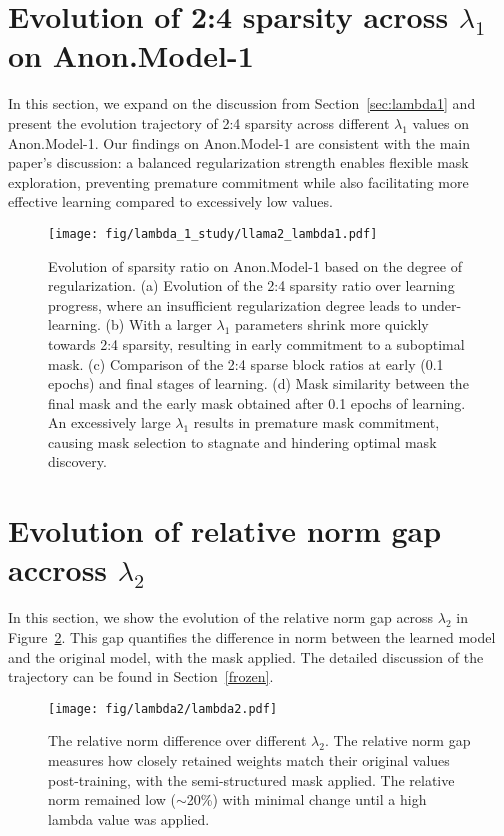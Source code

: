 \section{Evolution of 2:4 sparsity across $\lambda_{1}$ on Anon.Model-1}
In this section, we expand on the discussion from Section~\ref{sec:lambda1} and present the evolution trajectory of 2:4 sparsity across different $\lambda_{1}$ values on Anon.Model-1. Our findings on Anon.Model-1 are consistent with the main paper's discussion: a balanced regularization strength enables flexible mask exploration, preventing premature commitment while also facilitating more effective learning compared to excessively low values.
\label{app:reg_anon}
\begin{figure*}[!t]
    \centering
    \texttt{[image: fig/lambda\_1\_study/llama2\_lambda1.pdf]} 
\caption{Evolution of sparsity ratio on Anon.Model-1 based on the degree of regularization. (a) Evolution of the 2:4 sparsity ratio over learning progress, where an insufficient regularization degree leads to under-learning. (b) With a larger $\lambda_{1}$ parameters shrink more quickly towards 2:4 sparsity, resulting in early commitment to a suboptimal mask. (c) Comparison of the 2:4 sparse block ratios at early (0.1 epochs) and final stages of learning. (d) Mask similarity between the final mask and the early mask obtained after 0.1 epochs of learning. An excessively large $\lambda_{1}$ results in premature mask commitment, causing mask selection to stagnate and hindering optimal mask discovery.}
    \label{fig:llama-lambda}
    \vspace{-1.5em}
\end{figure*}

\section{Evolution of relative norm gap accross $\lambda_2$}
In this section, we show the evolution of the relative norm gap across $\lambda_{2}$ in Figure~\ref{fig:lambda2}. This gap quantifies the difference in norm between the learned model and the original model, with the mask applied. The detailed discussion of the trajectory can be found in Section~\ref{frozen}.
\label{app:reg_w0}
\begin{figure}[ht]
    \centering
    \texttt{[image: fig/lambda2/lambda2.pdf]} %
    \vspace{-0.5em}
    \caption{The relative norm difference over different $\lambda_{2}$. The relative norm gap measures how closely retained weights match their original values post-training, with the semi-structured mask applied. The relative norm remained low ($\sim$20\%) with minimal change until a high lambda value was applied.}
    \label{fig:lambda2}
    \vspace{-1em}
\end{figure}
\fi 
